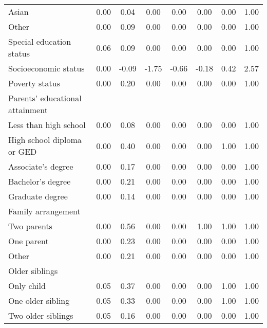 \documentclass[letterpaper, 12pt]{article}
\begin{document}
{\begin{longtable}{lSSSSSSS}
  \hspace{1em} Asian & 0.00 & 0.04 & 0.00 & 0.00 & 0.00 & 0.00 & 1.00 \\
  \hspace{1em} Other & 0.00 & 0.09 & 0.00 & 0.00 & 0.00 & 0.00 & 1.00 \\
  Special education status & 0.06 & 0.09 & 0.00 & 0.00 & 0.00 & 0.00 & 1.00 \\
  Socioeconomic status & 0.00 & -0.09 & -1.75 & -0.66 & -0.18 & 0.42 & 2.57 \\
  Poverty status & 0.00 & 0.20 & 0.00 & 0.00 & 0.00 & 0.00 & 1.00 \\
  Parents' educational attainment \\
  \hspace{1em} Less than high school & 0.00 & 0.08 & 0.00 & 0.00 & 0.00 & 0.00 & 1.00 \\
  \hspace{1em} High school diploma or GED & 0.00 & 0.40 & 0.00 & 0.00 & 0.00 & 1.00 & 1.00 \\
  \hspace{1em} Associate's degree & 0.00 & 0.17 & 0.00 & 0.00 & 0.00 & 0.00 & 1.00 \\
  \hspace{1em} Bachelor's degree & 0.00 & 0.21 & 0.00 & 0.00 & 0.00 & 0.00 & 1.00 \\
  \hspace{1em} Graduate degree & 0.00 & 0.14 & 0.00 & 0.00 & 0.00 & 0.00 & 1.00 \\
  Family arrangement \\
  \hspace{1em} Two parents & 0.00 & 0.56 & 0.00 & 0.00 & 1.00 & 1.00 & 1.00 \\
  \hspace{1em} One parent & 0.00 & 0.23 & 0.00 & 0.00 & 0.00 & 0.00 & 1.00 \\
  \hspace{1em} Other & 0.00 & 0.21 & 0.00 & 0.00 & 0.00 & 0.00 & 1.00 \\
  Older siblings \\
  \hspace{1em} Only child & 0.05 & 0.37 & 0.00 & 0.00 & 0.00 & 1.00 & 1.00 \\
  \hspace{1em} One older sibling & 0.05 & 0.33 & 0.00 & 0.00 & 0.00 & 1.00 & 1.00 \\
  \hspace{1em} Two older siblings & 0.05 & 0.16 & 0.00 & 0.00 & 0.00 & 0.00 & 1.00 \\

\end{longtable}}
\end{document}

